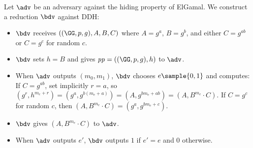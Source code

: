 \ifsolutions
\begin{mysolution}
   Let $\adv$ be an adversary against the hiding property of ElGamal.
  We construct a \ppt reduction $\bdv$ against DDH:
  \begin{itemize}
    \item $\bdv$ receives $(\gparam, A, B, C)$ where $A = g^a$, $B = g^b$, and either $C = g^{ab}$ or $C = g^c$ for random $c$.
    \item $\bdv$ sets $h = B$ and gives $\params = (\gparam, h)$ to $\adv$.
    \item When $\adv$ outputs $(m_0, m_1)$, $\bdv$ chooses $e \sample \{0, 1\}$ and computes:
          If $C = g^{ab}$, set implicitly $r = a$, so $(g^r, h^{m_e + r}) = (g^a, g^{b(m_e + a)}) = (A, g^{bm_e + ab}) = (A, B^{m_e} \cdot C)$.
          If $C = g^c$ for random $c$, then $(A, B^{m_e} \cdot C) = (g^a, g^{bm_e + c})$.
    \item $\bdv$ gives $(A, B^{m_e} \cdot C)$ to $\adv$.
    \item When $\adv$ outputs $e'$, $\bdv$ outputs $1$ if $e' = e$ and $0$ otherwise.
  \end{itemize}


\end{mysolution}
